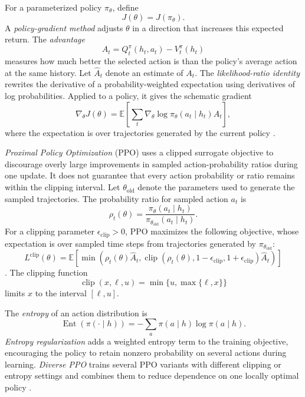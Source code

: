 For a parameterized policy $\pi_\theta$, define
\[
    J(\theta)=J(\pi_\theta).
\]
A \emph{policy-gradient method} adjusts $\theta$ in a direction that increases this expected return. The \emph{advantage}
\[
    A_t
    =
    Q_t^\pi(h_t,a_t)-V_t^\pi(h_t)
\]
measures how much better the selected action is than the policy's average action at the same history. Let $\widehat A_t$ denote an estimate of $A_t$. The \emph{likelihood-ratio identity} rewrites the derivative of a probability-weighted expectation using derivatives of log probabilities. Applied to a policy, it gives the schematic gradient
\[
    \nabla_\theta J(\theta)
    =
    \mathbb{E}
    \left[
      \sum_t
      \nabla_\theta
      \log\pi_\theta(a_t\mid h_t)
      A_t
    \right],
\]
where the expectation is over trajectories generated by the current policy \cite{sutton2000policygradient}.

\emph{Proximal Policy Optimization} (PPO) uses a clipped surrogate objective to discourage overly large improvements in sampled action-probability ratios during one update. It does not guarantee that every action probability or ratio remains within the clipping interval. Let $\theta_{\mathrm{old}}$ denote the parameters used to generate the sampled trajectories. The probability ratio for sampled action $a_t$ is
\[
    \rho_t(\theta)
    =
    \frac{\pi_\theta(a_t\mid h_t)}
         {\pi_{\theta_{\mathrm{old}}}(a_t\mid h_t)}.
\]
For a clipping parameter $\epsilon_{\mathrm{clip}}>0$, PPO maximizes the following objective, whose expectation is over sampled time steps from trajectories generated by $\pi_{\theta_{\mathrm{old}}}$:
\[
    L^{\mathrm{clip}}(\theta)
    =
    \mathbb{E}
    \left[
      \min
      \left(
        \rho_t(\theta)\widehat A_t,
        \operatorname{clip}
        (\rho_t(\theta),1-\epsilon_{\mathrm{clip}},1+\epsilon_{\mathrm{clip}})
        \widehat A_t
      \right)
    \right]
\]
\cite{schulman2017ppo}.
The clipping function
\[
    \operatorname{clip}(x,\ell,u)
    =
    \min\{u,\max\{\ell,x\}\}
\]
limits $x$ to the interval $[\ell,u]$.

The \emph{entropy} of an action distribution is
\[
    \operatorname{Ent}(\pi(\cdot\mid h))
    =
    -\sum_a\pi(a\mid h)\log\pi(a\mid h).
\]
\emph{Entropy regularization} adds a weighted entropy term to the training objective, encouraging the policy to retain nonzero probability on several actions during learning. \emph{Diverse PPO} trains several PPO variants with different clipping or entropy settings and combines them to reduce dependence on one locally optimal policy \cite{zhang2025diverse}.


